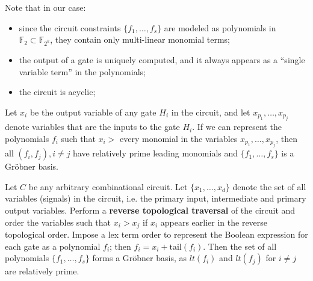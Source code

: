 Note that in our case: 
\begin{itemize}
\item since the circuit constraints $\{f_1, \dots,f_s\}$ are modeled
  as polynomials in $\mathbb{F}_2 \subset {\mathbb{F}}_{2^k}$,  they
  contain only multi-linear monomial terms;  
\item the output of a gate is uniquely computed, and it always appears
  as a ``single variable term'' in the 	polynomials; 
\item the circuit is acyclic;
\end{itemize}

Let $x_i$ be the output variable of any gate $H_i$ in the circuit, and
let $x_{p_1}, \dots,x_{p_j}$ denote variables that are the inputs to
the gate $H_i$.  If we can represent the polynomials $f_i$ such that
$x_i >$ every monomial  in the variables $x_{p_1}, \dots, x_{p_j}$,
then all $(f_i, f_j), i\neq j$ have  relatively prime leading
monomials and $\{f_1, \dots, f_s\}$ is a Gr\"obner basis. 

\begin{Proposition} \label{prop:top-order}
Let $C$ be any arbitrary combinational circuit. Let $\{x_1, \dots,
x_d\}$ denote the set of all variables (signals) in the circuit,
i.e. the primary input, intermediate and primary output
variables. Perform a {\bf reverse topological traversal} of the
circuit and order the variables such that $x_i > x_j$ if $x_i$ appears
earlier in the reverse topological order. Impose a lex term order to
represent the Boolean expression for each gate as a polynomial $f_i$;
then $f_i = x_i + \text{tail}(f_i)$. Then the set of all polynomials
$\{f_1, \dots, f_s\}$ forms a Gr\"obner basis, as $lt(f_i)$ and $
lt(f_j)$ for $i\neq j$ are relatively prime. 
\end{Proposition}
	
